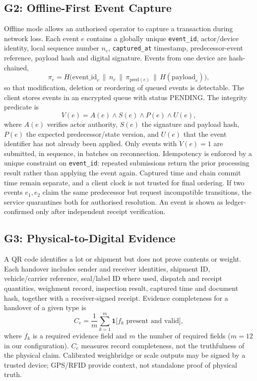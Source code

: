 \documentclass[conference,a4paper]{IEEEtran}
\newcommand{\ind}{\mathbf{1}}
\begin{document}
\subsection{G2: Offline-First Event Capture}
Offline mode allows an authorised operator to capture a transaction during network loss. Each event $e$ contains a globally unique \texttt{event\_id}, actor/device identity, local sequence number $n_e$, \texttt{captured\_at} timestamp, predecessor-event reference, payload hash and digital signature. Events from one device are hash-chained,
\begin{equation}
\pi_e=H\big(\mathrm{event\_id}_e\,\|\,n_e\,\|\,\pi_{\mathrm{pred}(e)}\,\|\,H(\mathrm{payload}_e)\big),
\label{eq:chain}
\end{equation}
so that modification, deletion or reordering of queued events is detectable. The client stores events in an encrypted queue with status PENDING. The integrity predicate is
\begin{equation}
V(e)=A(e)\wedge S(e)\wedge P(e)\wedge U(e),
\label{eq:V}
\end{equation}
where $A(e)$ verifies actor authority, $S(e)$ the signature and payload hash, $P(e)$ the expected predecessor/state version, and $U(e)$ that the event identifier has not already been applied. Only events with $V(e)=1$ are submitted, in sequence, in batches on reconnection. Idempotency is enforced by a unique constraint on \texttt{event\_id}: repeated submissions return the prior processing result rather than applying the event again. Captured time and chain commit time remain separate, and a client clock is not trusted for final ordering. If two events $e_1,e_2$ claim the same predecessor but request incompatible transitions, the service quarantines both for authorised resolution. An event is shown as ledger-confirmed only after independent receipt verification.

\subsection{G3: Physical-to-Digital Evidence}
A QR code identifies a lot or shipment but does not prove contents or weight. Each handover includes sender and receiver identities, shipment ID, vehicle/carrier reference, seal/label ID where used, dispatch and receipt quantities, weighment record, inspection result, captured time and document hash, together with a receiver-signed receipt. Evidence completeness for a handover of a given type is
\begin{equation}
C_e=\frac{1}{m}\sum_{k=1}^{m}\ind\big[f_k\text{ present and valid}\big],
\label{eq:Ce}
\end{equation}
where $f_k$ is a required evidence field and $m$ the number of required fields ($m=12$ in our configuration). $C_e$ measures record completeness, not the truthfulness of the physical claim. Calibrated weighbridge or scale outputs may be signed by a trusted device; GPS/RFID provide context, not standalone proof of physical truth.
\end{document}
